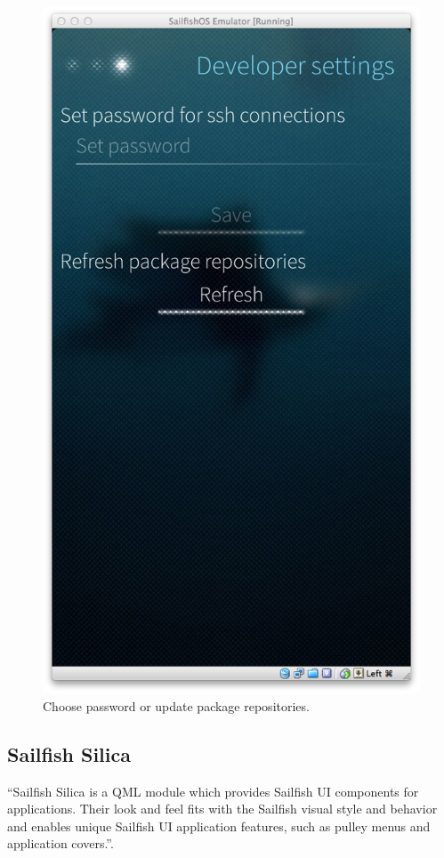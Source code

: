 \begin{figure}[H]
  \centering
  \includegraphics[scale=0.3]{../media/gfx/emulator/developerSettings01-04.png} 
  \caption{Choose password or update package repositories.}
  \label{fig:developerSettings01-04}
\end{figure}
%
%
\subsection{Sailfish Silica}\label{subsec:SailfishSilica}
%
``Sailfish Silica is a QML module which provides Sailfish UI components for applications. Their look and feel fits with the Sailfish visual style and behavior and enables unique Sailfish UI application features, such as pulley menus and application covers.''\cite{sailfishos3}.

